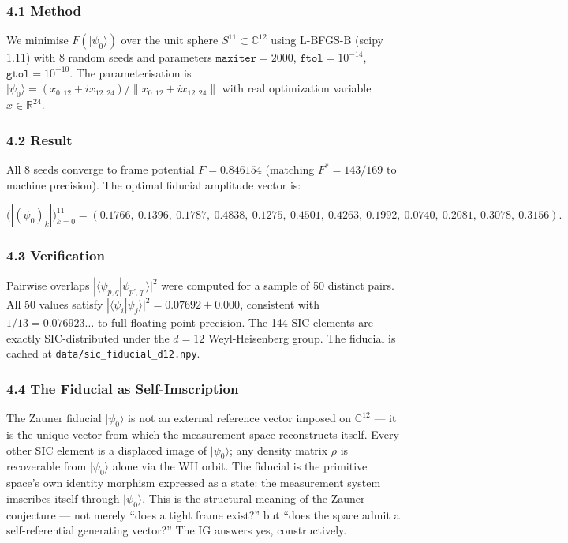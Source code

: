 \documentclass[12pt,a4paper]{article}
\begin{document}
\hypertarget{method}{%
\subsubsection{4.1 Method}\label{method}}

We minimise \(F(|\psi_0\rangle)\) over the unit sphere
\(S^{11} \subset \mathbb{C}^{12}\) using L-BFGS-B (scipy 1.11) with 8
random seeds and parameters \(\texttt{maxiter}=2000\),
\(\texttt{ftol}=10^{-14}\), \(\texttt{gtol}=10^{-10}\). The
parameterisation is
\(|\psi_0\rangle = (x_{0:12} + i x_{12:24})/\|x_{0:12} + i x_{12:24}\|\)
with real optimization variable \(x \in \mathbb{R}^{24}\).

\hypertarget{result}{%
\subsubsection{4.2 Result}\label{result}}

All 8 seeds converge to frame potential \(F = 0.846154\) (matching
\(F^* = 143/169\) to machine precision). The optimal fiducial amplitude
vector is:

\[\big(|(\psi_0)_k|\big)_{k=0}^{11} = (0.1766,\ 0.1396,\ 0.1787,\ 0.4838,\ 0.1275,\ 0.4501,\ 0.4263,\ 0.1992,\ 0.0740,\ 0.2081,\ 0.3078,\ 0.3156).\]

\hypertarget{verification}{%
\subsubsection{4.3 Verification}\label{verification}}

Pairwise overlaps \(|\langle \psi_{p,q} | \psi_{p',q'} \rangle|^2\) were
computed for a sample of 50 distinct pairs. All 50 values satisfy
\(|\langle \psi_i | \psi_j \rangle|^2 = 0.07692 \pm 0.000\), consistent
with \(1/13 = 0.076923\ldots\) to full floating-point precision. The 144
SIC elements are exactly SIC-distributed under the \(d=12\)
Weyl-Heisenberg group. The fiducial is cached at
\texttt{data/sic\_fiducial\_d12.npy}.

\hypertarget{the-fiducial-as-self-imscription}{%
\subsubsection{4.4 The Fiducial as
Self-Imscription}\label{the-fiducial-as-self-imscription}}

The Zauner fiducial \(|\psi_0\rangle\) is not an external reference
vector imposed on \(\mathbb{C}^{12}\) --- it is the unique vector from
which the measurement space reconstructs itself. Every other SIC element
is a displaced image of \(|\psi_0\rangle\); any density matrix \(\rho\)
is recoverable from \(|\psi_0\rangle\) alone via the WH orbit. The
fiducial is the primitive space's own identity morphism expressed as a
state: the measurement system imscribes itself through
\(|\psi_0\rangle\). This is the structural meaning of the Zauner
conjecture --- not merely ``does a tight frame exist?'' but ``does the
space admit a self-referential generating vector?'' The IG answers yes,
constructively.
\end{document}
